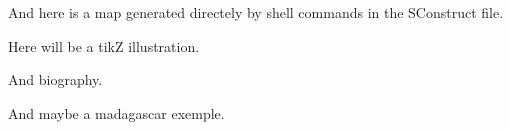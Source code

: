 \documentclass[11pt,a4paper]{article}
\begin{document}
And here is a map generated directely by shell commands in the SConstruct file. 


Here will be a tikZ illustration. 




And biography. 

And maybe a madagascar exemple. 
\end{document}
